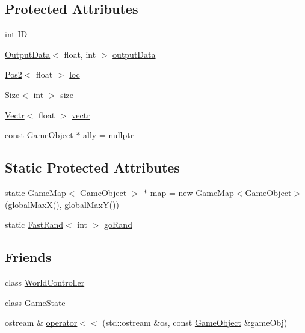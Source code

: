 \subsection*{Protected Attributes}
\begin{DoxyCompactItemize}
\item 
int \hyperlink{class_game_object_a4db8b68d725cbea63ea94ced03add071}{I\-D}
\item 
\hyperlink{struct_output_data}{Output\-Data}$<$ float, int $>$ \hyperlink{class_game_object_a05d328553084cd1f480a26985a4671b5}{output\-Data}
\item 
\hyperlink{struct_pos2}{Pos2}$<$ float $>$ \hyperlink{class_game_object_a6858e668e7d2c5ded850b952aaacd905}{loc}
\item 
\hyperlink{struct_size}{Size}$<$ int $>$ \hyperlink{class_game_object_ac4637e122291be2421c851e2a87fb968}{size}
\item 
\hyperlink{struct_vectr}{Vectr}$<$ float $>$ \hyperlink{class_game_object_aebcdb5143027789a5f3b0f4ada2dac6b}{vectr}
\item 
const \hyperlink{class_game_object}{Game\-Object} $\ast$ \hyperlink{class_game_object_a33c6fbb5bee4bf28ed70ae170b2fdb1a}{ally} = nullptr
\end{DoxyCompactItemize}
\subsection*{Static Protected Attributes}
\begin{DoxyCompactItemize}
\item 
static \hyperlink{class_game_map}{Game\-Map}$<$ \hyperlink{class_game_object}{Game\-Object} $>$ $\ast$ \hyperlink{class_game_object_a5043adc801cf04c0747a0cdf93997d45}{map} = new \hyperlink{class_game_map}{Game\-Map}$<$\hyperlink{class_game_object}{Game\-Object}$>$(\hyperlink{_default_config_8h_ac52cbe2be8df57c4bcb888fae55550a6}{global\-Max\-X}(), \hyperlink{_default_config_8h_aecae0abd5507af9315ddeb2ce60d7997}{global\-Max\-Y}())
\item 
static \hyperlink{class_fast_rand}{Fast\-Rand}$<$ int $>$ \hyperlink{class_game_object_adc2b5a062ff3d5ee496f47a0206ddcc7}{go\-Rand}
\end{DoxyCompactItemize}
\subsection*{Friends}
\begin{DoxyCompactItemize}
\item 
class \hyperlink{class_game_object_a19ecfd085a11c42d868e25c796419df8}{World\-Controller}
\item 
class \hyperlink{class_game_object_aefef8d7a397219a28f7808dc064e03c6}{Game\-State}
\item 
ostream \& \hyperlink{class_game_object_af878ba13a78e02d1acdb73ab3ec37110}{operator$<$$<$} (std\-::ostream \&os, const \hyperlink{class_game_object}{Game\-Object} \&game\-Obj)
\end{DoxyCompactItemize}



